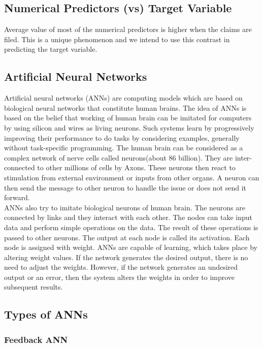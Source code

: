 \subsection{Numerical Predictors (vs) Target Variable}

 Average value of most of the numerical predictors is higher when the claims are filed. This is a unique phenomenon and we intend to use this contrast in predicting the target variable.
  
\subsection{Artificial Neural Networks}

Artificial neural networks (ANNs)  are computing models which are based on biological neural networks that constitute human brains. The idea of ANNs is based on the belief that working of human brain can be imitated for computers by using silicon and wires as living neurons. Such systems learn by progressively improving their performance to do tasks by considering examples, generally without task-specific programming. The human brain can be considered as a complex network of nerve cells called neurons(about 86 billion). They are inter-connected to other millions of cells by Axons. These neurons then react to stimulation from external environment or inputs from other organs. A neuron can then send the message to other neuron to handle the issue or does not send it forward. 
\\
ANNs also try to imitate biological neurons of human brain. The neurons are connected by links and they interact with each other. The nodes can take input data and perform simple operations on the data. The result of these operations is passed to other neurons. The output at each node is called its activation. Each node is assigned with weight. ANNs are capable of learning, which takes place by altering weight values. If the network generates the desired output, there is no need to adjust the weights. However, if the network generates an undesired output or an error, then the system alters the weights in order to improve subsequent results.

\subsection{Types of ANNs}

\subsubsection{Feedback ANN}

